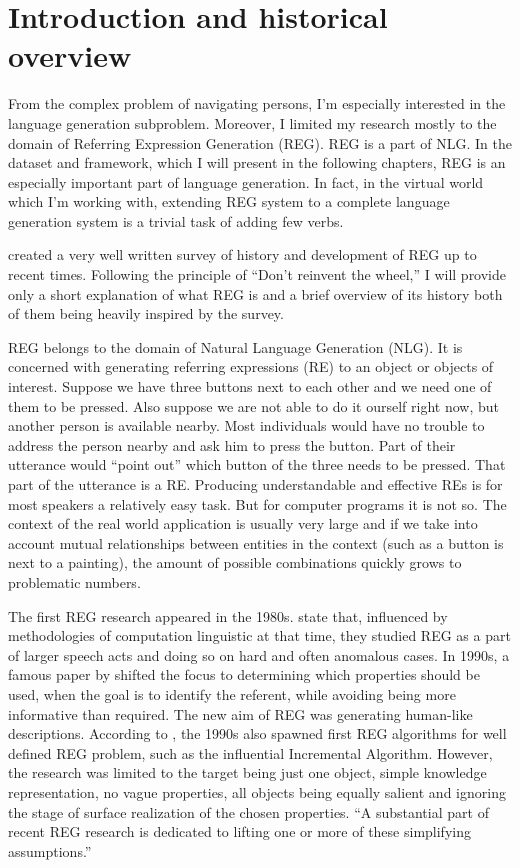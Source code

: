 \section{Introduction and historical overview}
\label{sec:bg-reg}
From the complex problem of navigating persons, I'm especially interested in the language generation subproblem. Moreover, I limited my research mostly to the domain of Referring Expression Generation (REG). REG is a part of NLG. In the dataset and framework, which I will present in the following chapters, REG is an especially important part of language generation. In fact, in the virtual world which I'm working with, extending REG system to a complete language generation system is a trivial task of adding few verbs.

\citet{krahmer2012computational} created a very well written survey of history and development of REG up to recent times. Following the principle of ``Don't reinvent the wheel,'' I will provide only a short explanation of what REG is and a brief overview of its history both of them being heavily inspired by the survey.

REG belongs to the domain of Natural Language Generation (NLG). It is concerned with generating referring expressions (RE) to an object or objects of interest. Suppose we have three buttons next to each other and we need one of them to be pressed. Also suppose we are not able to do it ourself right now, but another person is available nearby. Most individuals would have no trouble to address the person nearby and ask him to press the button. Part of their utterance would ``point out'' which button of the three needs to be pressed. That part of the utterance is a RE. Producing understandable and effective REs is for most speakers a relatively easy task. But for computer programs it is not so. The context of the real world application is usually very large and if we take into account mutual relationships between entities in the context (such as a button is next to a painting), the amount of possible combinations quickly grows to problematic numbers. 

The first REG research appeared in the 1980s. \citet{krahmer2012computational} state that, influenced by methodologies of computation linguistic at that time, they studied REG as a part of larger speech acts and doing so on hard and often anomalous cases. In 1990s, a famous paper by \citet{dale1995computational} shifted the focus to determining which properties should be used, when the goal is to identify the referent, while avoiding being more informative than required. The new aim of REG was generating human-like descriptions.  According to \citet{krahmer2012computational}, the 1990s also spawned first REG algorithms for well defined REG problem, such as the influential Incremental Algorithm. However, the research was limited to the target being just one object, simple knowledge representation, no vague properties, all objects being equally salient and ignoring the stage of surface realization of the chosen properties. ``A substantial part of recent REG research is dedicated to lifting one or more of these simplifying assumptions.'' \citep{krahmer2012computational} 

